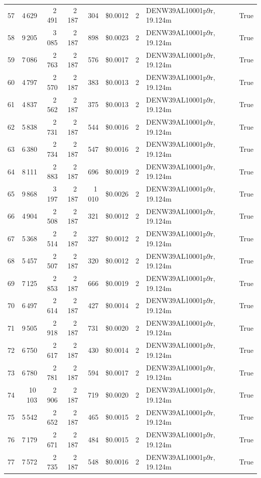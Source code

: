 \documentclass[a4paper,11pt]{article}
\begin{document}
\begin{table}[ht]
\begin{tabular}{r r r r r r r p{3cm} l}
57 & 4\,629 & 2\,491 & 2\,187 & 304 & \$0.0012 & 2 & DENW39AL10001p9r, 19.124m & True \\
58 & 9\,205 & 3\,085 & 2\,187 & 898 & \$0.0023 & 2 & DENW39AL10001p9r, 19.124m & True \\
59 & 7\,086 & 2\,763 & 2\,187 & 576 & \$0.0017 & 2 & DENW39AL10001p9r, 19.124m & True \\
60 & 4\,797 & 2\,570 & 2\,187 & 383 & \$0.0013 & 2 & DENW39AL10001p9r, 19.124m & True \\
61 & 4\,837 & 2\,562 & 2\,187 & 375 & \$0.0013 & 2 & DENW39AL10001p9r, 19.124m & True \\
62 & 5\,838 & 2\,731 & 2\,187 & 544 & \$0.0016 & 2 & DENW39AL10001p9r, 19.124m & True \\
63 & 6\,380 & 2\,734 & 2\,187 & 547 & \$0.0016 & 2 & DENW39AL10001p9r, 19.124m & True \\
64 & 8\,111 & 2\,883 & 2\,187 & 696 & \$0.0019 & 2 & DENW39AL10001p9r, 19.124m & True \\
65 & 9\,868 & 3\,197 & 2\,187 & 1\,010 & \$0.0026 & 2 & DENW39AL10001p9r, 19.124m & True \\
66 & 4\,904 & 2\,508 & 2\,187 & 321 & \$0.0012 & 2 & DENW39AL10001p9r, 19.124m & True \\
67 & 5\,368 & 2\,514 & 2\,187 & 327 & \$0.0012 & 2 & DENW39AL10001p9r, 19.124m & True \\
68 & 5\,457 & 2\,507 & 2\,187 & 320 & \$0.0012 & 2 & DENW39AL10001p9r, 19.124m & True \\
69 & 7\,125 & 2\,853 & 2\,187 & 666 & \$0.0019 & 2 & DENW39AL10001p9r, 19.124m & True \\
70 & 6\,497 & 2\,614 & 2\,187 & 427 & \$0.0014 & 2 & DENW39AL10001p9r, 19.124m & True \\
71 & 9\,505 & 2\,918 & 2\,187 & 731 & \$0.0020 & 2 & DENW39AL10001p9r, 19.124m & True \\
72 & 6\,750 & 2\,617 & 2\,187 & 430 & \$0.0014 & 2 & DENW39AL10001p9r, 19.124m & True \\
73 & 6\,780 & 2\,781 & 2\,187 & 594 & \$0.0017 & 2 & DENW39AL10001p9r, 19.124m & True \\
74 & 10\,103 & 2\,906 & 2\,187 & 719 & \$0.0020 & 2 & DENW39AL10001p9r, 19.124m & True \\
75 & 5\,542 & 2\,652 & 2\,187 & 465 & \$0.0015 & 2 & DENW39AL10001p9r, 19.124m & True \\
76 & 7\,179 & 2\,671 & 2\,187 & 484 & \$0.0015 & 2 & DENW39AL10001p9r, 19.124m & True \\
77 & 7\,572 & 2\,735 & 2\,187 & 548 & \$0.0016 & 2 & DENW39AL10001p9r, 19.124m & True \\

\end{tabular}
\end{table}
\end{document}
